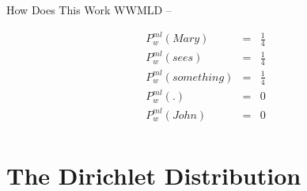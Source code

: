 \documentclass[11pt]{beamer}
\begin{document}
	\begin{frame}{How Does This Work}
		WWMLD --
		
		\begin{align*}
			P^{ml}_{w}(Mary) & = & \frac{1}{4}\\
			P^{ml}_{w}(sees) & = & \frac{1}{4}\\
			P^{ml}_{w}(something) & = & \frac{1}{4}\\
			P^{ml}_{w}(.) & = & 0 \\
			P^{ml}_{w}(John) & = & 0\\
		\end{align*}		
	\end{frame}
	
	\section{The Dirichlet Distribution}
	
\end{document}
